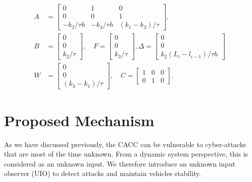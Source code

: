 \documentclass[conference]{IEEEtran}
\begin{document}
\begin{equation}
    \begin{aligned}
        A & =\left[\begin{array}{ccc}
        0 & 1 & 0 \\
        0 & 0 & 1 \\
        -k_2 / \tau h & -k_3 / \tau h & \left(k_1-k_3\right) / \tau
        \end{array}\right], \\
        B & =\left[\begin{array}{c}
        0 \\
        0 \\
        k_2 / \tau
        \end{array}\right], \quad F=\left[\begin{array}{c}
        0 \\
        0 \\
        k_3 / \tau
        \end{array}\right], \Delta=\left[\begin{array}{c}
        0 \\
        0 \\
        k_2\left(L_i-l_{i-1}\right) / \tau h
        \end{array}\right] \\
        W & =\left[\begin{array}{c}
        0 \\
        0 \\
        \left(k_3-k_1\right) / \tau
        \end{array}\right], \quad C=\left[\begin{array}{lll}
        1 & 0 & 0 \\
        0 & 1 & 0
        \end{array}\right].
    \end{aligned}
\end{equation}


\section{Proposed Mechanism}
\label{sec2}
As we have discussed previously, the CACC can be vulnerable to cyber-attacks that are most of the time unknown. From a dynamic system perspective, this is considered as an unknown input. We therefore introduce an unknown input observer (UIO) to detect attacks and maintain vehicles stability. 
\end{document}

